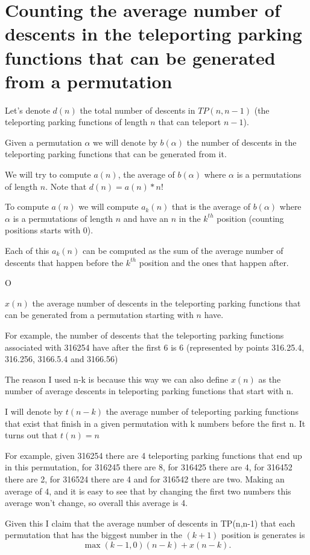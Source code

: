 \documentclass{article}
\begin{document}
\section{Counting the average number of descents in the teleporting parking functions that can be generated from a permutation}

Let's denote $d(n)$ the total number of descents in $TP(n,n-1)$ (the teleporting parking functions of length $n$ that can teleport $n-1$).

Given a permutation $\alpha$ we will denote by $b(\alpha)$ the number of descents in the teleporting parking functions that can be generated from it. 

We will try to compute $a(n)$, the average of $b(\alpha)$ where $\alpha$ is a permutations of length $n$. Note that $d(n)=a(n)*n!$

To compute $a(n)$ we will compute $a_k(n)$ that is the average of $b(\alpha)$ where $\alpha$ is a permutations of length $n$ and have an $n$ in the $k^{th}$ position (counting positions starts with 0).

Each of this $a_k(n)$ can be computed as the sum of the average number of descents that happen before the $k^{th}$ position and the ones that happen after.

O

$x(n)$ the average number of descents in the teleporting parking functions that can be generated from a permutation starting with $n$ have.

For example, the number of descents that the teleporting parking functions associated with 316254 have after the first 6 is 6 (represented by points 316.25.4, 316.256, 3166.5.4 and 3166.56)

The reason I used n-k is because this way we can also define $x(n)$ as the number of average descents in teleporting parking functions that start with n.

I will denote by $t(n-k)$ the average number of teleporting parking functions that exist that finish in a given permutation with k numbers before the first n. It turns out that $t(n)=n$

For example, given 316254 there are 4 teleporting parking functions that end up in this permutation, for 316245 there are 8, for 316425 there are 4, for 316452 there are 2, for 316524 there are 4 and for 316542 there are two. Making an average of 4, and it is easy to see that by changing the first two numbers this average won't change, so overall this average is 4.

Given this I claim that the average number of descents in TP(n,n-1) that each permutation that has the biggest number in the $(k+1)$ position is generates is
$$
\max(k-1,0)(n-k) + x(n-k).
$$
\end{document}
